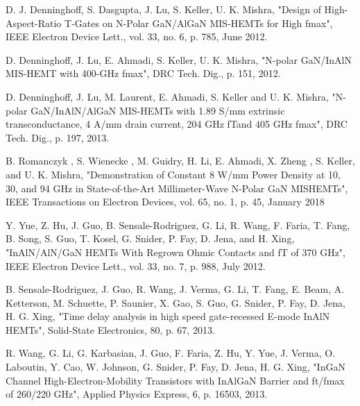 \documentclass[journal]{IEEEtran}
\begin{document}
\begin{thebibliography}{00}
 D. J. Denninghoff, S. Dasgupta, J. Lu, S. Keller, U. K. Mishra, "Design of High-Aspect-Ratio T-Gates on N-Polar GaN/AlGaN MIS-HEMTs for High fmax",  IEEE Electron Device Lett., vol. 33, no. 6, p. 785, June 2012.

 D. Denninghoff, J. Lu, E. Ahmadi, S. Keller, U. K. Mishra, "N-polar GaN/InAlN MIS-HEMT with 400-GHz fmax", DRC Tech. Dig., p. 151, 2012.

 D. Denninghoff, J. Lu, M. Laurent, E. Ahmadi, S. Keller and U. K. Mishra, "N-polar GaN/InAlN/AlGaN MIS-HEMTs with 1.89 S/mm extrinsic transconductance, 4 A/mm drain current, 204 GHz fTand 405 GHz fmax", DRC Tech. Dig., p. 197, 2013.

 B. Romanczyk , S. Wienecke , M. Guidry, H. Li, E. Ahmadi, X. Zheng , S. Keller, and U. K. Mishra, "Demonstration of Constant 8 W/mm Power Density at 10, 30, and 94 GHz in State-of-the-Art Millimeter-Wave N-Polar GaN MISHEMTs", IEEE Transactions on Electron Devices, vol. 65, no. 1, p. 45,  January 2018

 Y. Yue, Z. Hu, J. Guo, B. Sensale-Rodriguez, G. Li, R. Wang, F. Faria, T. Fang, B. Song, S. Guo, T. Kosel, G. Snider, P. Fay, D. Jena, and H. Xing, "InAlN/AlN/GaN HEMTs With Regrown Ohmic Contacts and fT of 370 GHz", IEEE Electron Device Lett., vol. 33, no. 7, p. 988, July 2012.

 B. Sensale-Rodriguez, J. Guo, R. Wang, J. Verma, G. Li, T. Fang, E. Beam, A. Ketterson, M. Schuette, P. Saunier, X. Gao, S. Guo, G. Snider, P. Fay, D. Jena, H. G. Xing, "Time delay analysis in high speed gate-recessed E-mode InAlN HEMTs", Solid-State Electronics, 80, p. 67, 2013.

 R. Wang, G. Li, G. Karbasian, J. Guo, F. Faria, Z. Hu, Y. Yue, J. Verma, O. Laboutin, Y. Cao, W. Johnson, G. Snider, P. Fay, D. Jena, H. G. Xing, "InGaN Channel High-Electron-Mobility Transistors with InAlGaN Barrier and ft/fmax of 260/220 GHz", Applied Physics Express, 6, p. 16503, 2013.

\end{thebibliography}
\end{document}
